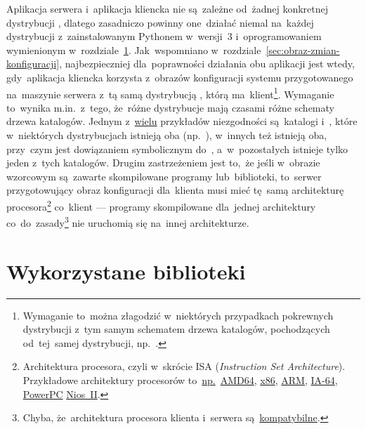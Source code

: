 \documentclass[thesis]{subfiles}
\begin{document}
Aplikacja serwera i~aplikacja kliencka nie są~zależne od~żadnej konkretnej dystrybucji , dlatego zasadniczo powinny one~działać niemal na~każdej dystrybucji z~zainstalowanym Pythonem w~wersji~3 i~oprogramowaniem wymienionym w~rozdziale~\ref{sec:wykorzystane-oprogramowanie}. Jak~wspomniano w~rozdziale~\ref{sec:obraz-zmian-konfiguracji}, najbezpieczniej dla~poprawności działania obu aplikacji jest wtedy, gdy~aplikacja kliencka korzysta z~obrazów konfiguracji systemu przygotowanego na~maszynie serwera z~tą samą dystrybucją , którą ma~klient\footnote{Wymaganie to~można złagodzić w~niektórych przypadkach pokrewnych dystrybucji z~tym samym schematem drzewa katalogów, pochodzących od~tej~samej dystrybucji, np.~\debian{}.}. Wymaganie to~wynika m.in.~z~tego, że~różne dystrybucje mają czasami różne schematy drzewa katalogów. Jednym z~\href{https://en.wikipedia.org/wiki/Filesystem_Hierarchy_Standard#FHS_compliance}{wielu} przykładów niezgodności są~katalogi  i~, które w~niektórych dystrybucjach istnieją oba (np.~\debian{}), w~innych też istnieją oba, przy~czym  jest dowiązaniem symbolicznym do~, a~w~pozostałych istnieje tylko jeden z~tych katalogów. Drugim zastrzeżeniem jest to,~że jeśli w~obrazie wzorcowym są~zawarte skompilowane programy lub~biblioteki, to~serwer przygotowujący obraz konfiguracji dla~klienta musi mieć tę~samą architekturę procesora\footnote{Architektura procesora, czyli w~skrócie ISA (\emph{Instruction Set Architecture}). Przykładowe architektury procesorów to~\href{https://en.wikipedia.org/wiki/List_of_instruction_sets}{np.}~\href{https://en.wikipedia.org/wiki/X86-64}{AMD64}, \href{https://en.wikipedia.org/wiki/X86}{x86}, \href{https://en.wikipedia.org/wiki/ARM_architecture}{ARM}, \href{https://en.wikipedia.org/wiki/IA-64}{IA-64}, \href{https://en.wikipedia.org/wiki/PowerPC}{PowerPC} \href{https://en.wikipedia.org/wiki/Nios_II}{Nios~II}.} co~klient --- programy skompilowane dla~jednej architektury co~do~zasady\footnote{Chyba, że~architektura procesora klienta i~serwera są~\href{https://en.wikipedia.org/wiki/X86-64\#OPMODES}{kompatybilne}.} nie uruchomią się na~innej architekturze.


\section{Wykorzystane biblioteki}
\label{sec:wykorzystane-oprogramowanie}
\end{document}
